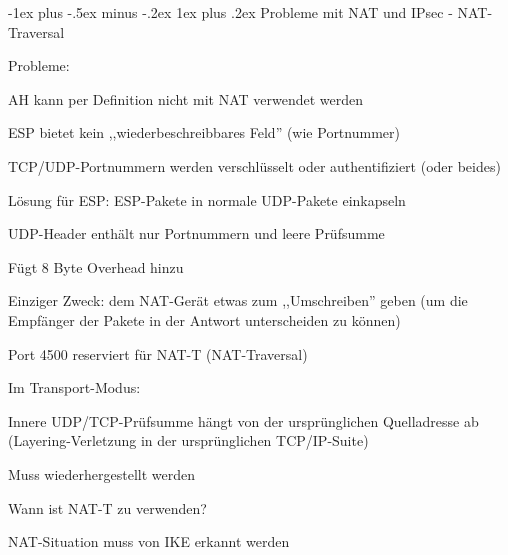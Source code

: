\documentclass[a4paper]{article}
\makeatletter
\renewcommand{\subsubsection}{\@startsection{subsubsection}{3}{0mm}%
 {-1ex plus -.5ex minus -.2ex}%
 {1ex plus .2ex}%
 {\normalfont\small\bfseries}}
\makeatother
\begin{document}
\begin{multicols}{3}
\begin{itemize*}
            \subsubsection{Probleme mit NAT und IPsec - NAT-Traversal}
            \begin{itemize*}
                  \item Probleme:
                  \begin{itemize*}
                        \item AH kann per Definition nicht mit NAT verwendet werden
                        \item ESP bietet kein ,,wiederbeschreibbares Feld'' (wie Portnummer)
                        \item TCP/UDP-Portnummern werden verschlüsselt oder authentifiziert (oder beides)
                  \end{itemize*}
                  \item Lösung für ESP: ESP-Pakete in normale UDP-Pakete einkapseln
                  \item UDP-Header enthält nur Portnummern und leere Prüfsumme
                  \begin{itemize*}
                        \item Fügt 8 Byte Overhead hinzu
                        \item Einziger Zweck: dem NAT-Gerät etwas zum ,,Umschreiben'' geben (um die Empfänger der Pakete in der Antwort unterscheiden zu können)
                        \item Port 4500 reserviert für NAT-T (NAT-Traversal)
                  \end{itemize*}
                  \item       Im Transport-Modus:
                  \begin{itemize*}
                        \item Innere UDP/TCP-Prüfsumme hängt von der ursprünglichen Quelladresse ab (Layering-Verletzung in der ursprünglichen TCP/IP-Suite)
                        \item Muss wiederhergestellt werden
                  \end{itemize*}
                  \item       Wann ist NAT-T zu verwenden?
                  \begin{itemize*}
                        \item NAT-Situation muss von IKE erkannt werden

\end{itemize*}
\end{itemize*}
\end{itemize*}
\end{multicols}
\end{document}
